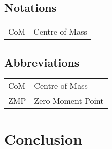 \documentclass{thesisreport}
\begin{document}




 
 
\section*{Notations}
    \begin{tabular}{p{3cm}p{10cm}}
    CoM & Centre of Mass
    \end{tabular}

\newpage

\section*{Abbreviations}

\begin{tabular}{p{3cm}p{10cm}}
CoM & Centre of Mass \\
ZMP & Zero Moment Point \\

\end{tabular}

 \newpage
 
 \tableofcontents

 \listoffigures
 
\listoftables
 

 
 
 
  
  
 
 
 \chapter*{Conclusion}
 
 
 
 
 
 \appendix	
 
 
 
 
 
 
 
 
\end{document}
